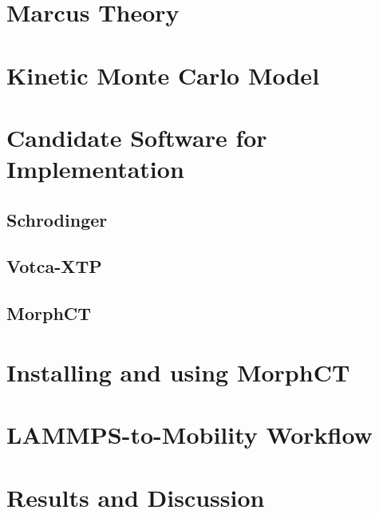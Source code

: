 \documentclass{article}
\begin{document}
\section{Marcus Theory}


\section{Kinetic Monte Carlo Model}



\section{Candidate Software for Implementation}

\subsection{Schrodinger}

\subsection{Votca-XTP}

\subsection{MorphCT}


\section{Installing and using MorphCT}

\section{LAMMPS-to-Mobility Workflow}

\section{Results and Discussion}

\end{document}
